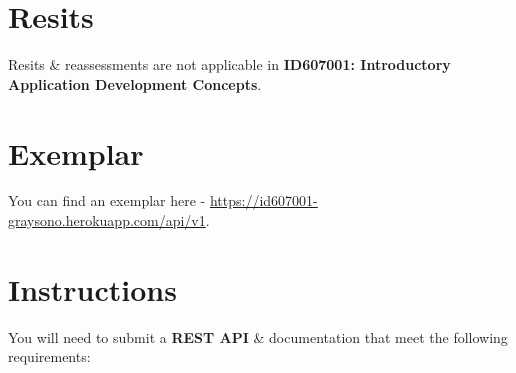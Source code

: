 \documentclass{article}
\begin{document}
\section*{Resits}
Resits \& reassessments are not applicable in \textbf{ID607001: Introductory Application Development Concepts}.

\newpage

\section*{Exemplar}
You can find an exemplar here - \small\href{https://id607001-graysono.herokuapp.com/api/v1}{https://id607001-graysono.herokuapp.com/api/v1}.

\section*{Instructions}
You will need to submit a \textbf{REST API} \& documentation that meet the following requirements:
\end{document}
